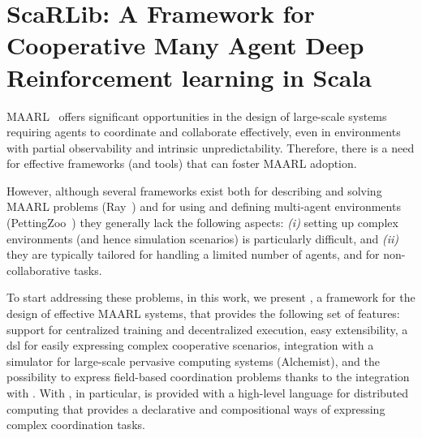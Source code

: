 %

%
%
%
%
\chapter[ScaRLib]{ScaRLib: A Framework for Cooperative Many Agent Deep Reinforcement learning in Scala}\label{chap:rl:scarlib}%
%
\minitoc%
%
\Ac{MAARL}~\cite{yang2021many,https://doi.org/10.48550/arxiv.2106.09825}
 offers significant opportunities in the design of large-scale systems
 requiring agents to coordinate and collaborate effectively, 
 even in environments with partial observability and intrinsic unpredictability. 
%
Therefore, there is a need for effective frameworks (and tools) that can foster \ac{MAARL} adoption.

% 
However, although several frameworks exist both for describing and solving \ac{MAARL} problems (Ray~\cite{ray}) 
and for using and defining multi-agent environments (PettingZoo~\cite{NEURIPS2021_7ed2d345}) 
they generally lack the following aspects: \emph{(i)} setting up complex environments (and hence simulation scenarios) is particularly difficult, and 
\emph{(ii)} they are typically tailored for handling a limited number of agents, and for non-collaborative tasks.

To start addressing these problems, in this work, we present \scarlib{}, 
 a framework for the design of effective \ac{MAARL} systems, that 
 provides the following set of features:
 support for centralized training and decentralized execution, 
 easy extensibility, 
 a \ac{dsl} for easily expressing complex cooperative scenarios, 
 integration with a simulator for large-scale pervasive computing systems (Alchemist),
 and the possibility to express field-based coordination problems thanks to the integration with \scafi{}.
%
With \scafi{}, in particular, \scarlib{} is provided with a high-level language for distributed computing that provides a declarative
 and compositional ways of expressing complex coordination tasks. 

